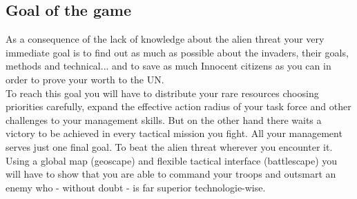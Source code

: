 \subsection{Goal of the game}
As a consequence of the lack of knowledge about the alien threat your very immediate goal is to find out as much as possible about the invaders, their goals, methods and technical... and to save as much Innocent citizens as you can in order to prove your worth to the UN.\\
To reach this goal you will have to distribute your rare resources choosing priorities carefully, expand the effective action radius of your task force and other challenges to your management skills. But on the other hand there waits a victory to be achieved in every tactical mission you fight. All your management serves just one final goal. To beat the alien threat wherever you encounter it. Using a global map (geoscape) and flexible tactical interface (battlescape) you will have to show that you are able to command your troops and outsmart an enemy who - without doubt - is far superior technologie-wise.
